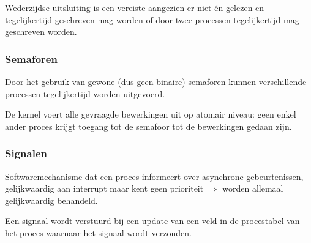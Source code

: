 Wederzijdse uitsluiting is een vereiste aangezien er niet én gelezen en tegelijkertijd geschreven mag worden of door twee processen tegelijkertijd mag geschreven worden.


\subsubsection{Semaforen}

Door het gebruik van gewone (dus geen binaire) semaforen kunnen verschillende processen tegelijkertijd worden uitgevoerd.

De kernel voert alle gevraagde bewerkingen uit op atomair niveau: geen enkel ander proces krijgt toegang tot de semafoor tot de bewerkingen gedaan zijn.


\subsubsection{Signalen}

Softwaremechanisme dat een proces informeert over asynchrone gebeurtenissen, gelijkwaardig aan interrupt maar kent geen prioriteit $\Rightarrow$ worden allemaal gelijkwaardig behandeld.

Een signaal wordt verstuurd bij een update van een veld in de procestabel van het proces waarnaar het signaal wordt verzonden.
